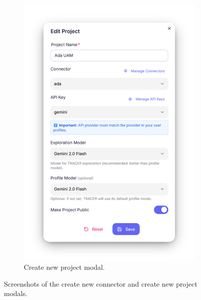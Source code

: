 \begin{figure}[htb!]
{\begin{subfigure}[c]{0.52\textwidth}
      \includegraphics[width=\linewidth]{figures/cropped-ss/create-project.png}
      \caption{Create new project modal.}
      \label{fig:ss-new-project}
    \end{subfigure}
  }
  \caption{Screenshots of the create new connector and create new project modals.}
  \label{fig:ss-modals}
\end{figure}

